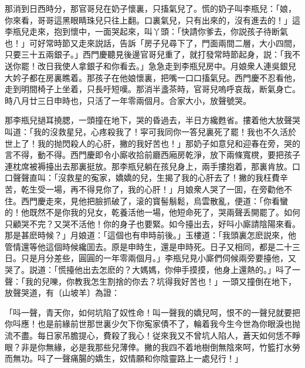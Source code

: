 那消到日西時分，那官哥兒在奶子懷裏，只搐氣兒了。慌的奶子叫李瓶兒：「娘，你來看，哥哥這黑眼睛珠兒只往上翻。口裏氣兒，只有出來的，沒有進去的！」這李瓶兒走來，抱到懷中，一面哭起來，叫丫頭：「快請你爹去，你説孩子待断氣也！」可好常時節又走來説話，告訴「房子兒尋下了，門面兩間二層，大小四間，只要三十五兩銀子。」西門慶聽見後邊官哥兒重了，就打發常時節起身，説：「我不送你罷！改日我使人拿銀子和你看去。」急急走到李瓶兒房中。月娘衆人連吳銀兒大妗子都在房裏瞧着。那孩子在他娘懷裏，把嘴一口口搐氣兒。西門慶不忍看他，走到明間椅子上坐着，只長吁短嘆。那消半盞茶時，官哥兒嗚呼哀哉，断氣身亡。時八月廿三日申時也，只活了一年零兩個月。合家大小，放聲號哭。

那李瓶兒撾耳撓腮，一頭撞在地下，哭的昏過去，半日方纔甦省。摟着他大放聲哭叫道：「我的沒救星兒，心疼殺我了！寜可我同你一答兒裏死了罷！我也不久活於世上了！我的抛閃殺人的心肝，撇的我好苦也！」那奶子如意兒和迎春在旁，哭的言不得，動不得。西門慶即令小廝收拾前廳西廂房乾淨，放下兩條寬櫈，要把孩子連枕席被褥擡出去那裏挺放。那李瓶兒躺在孩兒身上，兩手摟抱着，那裏肯放。口口聲聲直叫：「沒救星的寃家，嬌嬌的兒，生揭了我的心肝去了！撇的我枉費辛苦，乾生受一場，再不得見你了，我的心肝！」月娘衆人哭了一囬，在旁勸他不住。西門慶走來，見他把臉抓破了，滚的寳髻鬅鬆，烏雲散亂，便道：「你看蠻的！他既然不是你我的兒女，乾養活他一場，他短命死了，哭兩聲丢開罷了。如何只顧哭不完？又哭不活他！你的身子也要緊。如今擡出去，好呌小廝請陰陽來看。那是甚麽時候？」月娘道：「這個也有申時前後。」玉樓道：「我頭裏怎麽説來，他管情還等他這個時候纔囬去。原是申時生，還是申時死。日子又相同，都是二十三日。只是月分差些，圓圓的一年零兩個月。」李瓶兒見小廝們伺候兩旁要擡他，又哭了。説道：「慌擡他出去怎麽的？大媽媽，你伸手摸摸，他身上還熱的。」呌了一聲：「我的兒嚛，你教我怎生割捨的你去？坑得我好苦也！」一頭又撞倒在地下，放聲哭道，有〔山坡羊〕為證：

\begin{myquote}
「呌一聲，青天你，如何坑陷了奴性命！叫一聲我的嬌兒呵，恨不的一聲兒就要把你呌應！也是前緣前世那世裏少欠下你寃家債不了，輪着我今生今世為你眼淚也抛流不盡。每日家吊膽提心，費殺了我心！従來我又不曾坑人陷人，蒼天如何恁不睜眼？非是你無緣，必是我那些兒薄倖。撇的我四不着地樹倒無陰來呵，竹籃打水勞而無功。呌了一聲痛腸的嬌生，奴情願和你陰靈路上一處兒行！」
\end{myquote}

